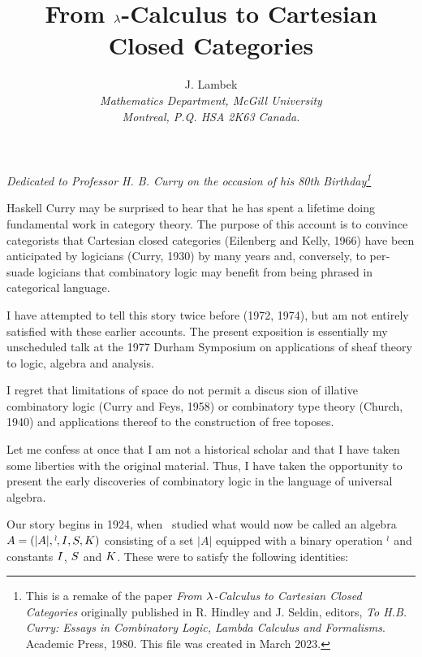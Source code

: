 \def\eqx{\underrel{x}{=}}

\makeatletter
\newcommand*\dotop{\mathpalette\bigcdot@{.6}}
\newcommand*\bigcdot@[2]{\mathbin{\vcenter{\hbox{\scalebox{#2}{$\m@th#1\bullet$}}}}}
\makeatother

\title{\large From $\lambda$-Calculus to Cartesian Closed Categories}
\author{\normalsize J. Lambek \\
{\small\it Mathematics Department, McGill University} \\
{\small\it Montreal, P.Q. HSA 2K63 Canada.}}

\maketitle
{\centerline
{\small\it Dedicated to Professor H. B. Curry on the occasion of his 80th Birthday\footnote{
This is a remake of the paper {\it From $\lambda$-Calculus to Cartesian Closed Categories} originally published in R. Hindley and J. Seldin, 
editors, {\it To H.B. Curry: Essays in Combinatory Logic, Lambda Calculus and Formalisms}. 
Academic Press, 1980. This file was created in March 2023.}}}
\bigskip\bigskip

\noindent
Haskell Curry may be surprised to hear that he has spent a lifetime doing fundamental work in category theory. The purpose of this account is to convince categorists that Cartesian closed categories (Eilenberg and Kelly, 1966) have been anticipated by logicians (Curry, 1930) by many years and, conversely, to per­ suade logicians that combinatory logic may benefit from being phrased in categorical language.

I have attempted to tell this story twice before (1972, 1974), but am not entirely satisfied with these earlier accounts. The present exposition is essentially my unscheduled talk at the 1977 Durham Symposium on applications of sheaf theory to logic, algebra and analysis.

I regret that limitations of space do not permit a discus­ sion of illative combinatory logic (Curry and Feys, 1958) or combinatory type theory (Church, 1940) and applications thereof to the construction of free toposes.

Let me confess at once that I am not a historical scholar
and that I have taken some liberties with the original material. Thus, I have taken the opportunity to present the early discov­eries of combinatory logic in the language of universal algebra.

Our story begins in 1924, when \schon\ studied what would now be called an algebra $A = (|A|, \mathop{{}^\wr}\kern-.8pt, {I}, {S}, {K})$ consisting of
a set $|A|$ equipped with a binary operation $\mathop{{}^\wr}\kern-.8pt$
and constants ${I}$, ${S}$ and ${K}$. These were to satisfy the following identities:

